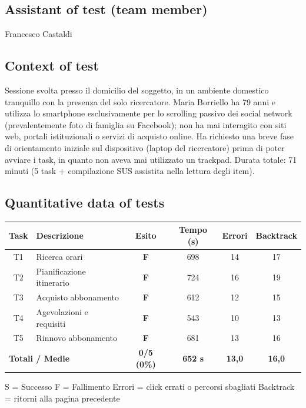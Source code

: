 \documentclass[11pt,a4paper]{article}
\begin{document}
\subsection*{Assistant of test (team member)}
\begin{tcolorbox}[colback=backgroundColor,colframe=borderColor,arc=2mm]
Francesco Castaldi
\end{tcolorbox}

\subsection*{Context of test}
\begin{tcolorbox}[colback=backgroundColor,colframe=borderColor,arc=2mm]
Sessione svolta presso il domicilio del soggetto, in un
ambiente domestico tranquillo con la presenza del solo
ricercatore. Maria Borriello ha 79 anni e utilizza lo
smartphone esclusivamente per lo scrolling passivo dei
social network (prevalentemente foto di famiglia su
Facebook); non ha mai interagito con siti web, portali
istituzionali o servizi di acquisto online. Ha richiesto
una breve fase di orientamento iniziale sul dispositivo
(laptop del ricercatore) prima di poter avviare i task,
in quanto non aveva mai utilizzato un trackpad. Durata
totale: 71 minuti (5 task + compilazione SUS assistita
nella lettura degli item).
\end{tcolorbox}

\subsection*{Quantitative data of tests}
\begin{tcolorbox}[colback=backgroundColor,colframe=borderColor,arc=2mm]
\begin{center}
\renewcommand{\arraystretch}{1.4}
\begin{tabular}{clcccc}
\toprule
\textbf{Task} & \textbf{Descrizione} &
\textbf{Esito} & \textbf{Tempo (s)} &
\textbf{Errori} & \textbf{Backtrack} \\
\midrule
T1 & Ricerca orari             & \textbf{F} & 698 & 14 & 17 \\
T2 & Pianificazione itinerario & \textbf{F} & 724 & 16 & 19 \\
T3 & Acquisto abbonamento      & \textbf{F} & 612 & 12 & 15 \\
T4 & Agevolazioni e requisiti  & \textbf{F} & 543 & 10 & 13 \\
T5 & Rinnovo abbonamento       & \textbf{F} & 681 & 13 & 16 \\
\midrule
\multicolumn{2}{l}{\textbf{Totali / Medie}} &
\textbf{0/5 (0\%)} & \textbf{652 s} &
\textbf{13,0} & \textbf{16,0} \\
\bottomrule
\end{tabular}
\end{center}
\vspace{0.3cm}
\small S = Successo \quad F = Fallimento \quad
Errori = click errati o percorsi sbagliati \quad
Backtrack = ritorni alla pagina precedente
\end{tcolorbox}
\end{document}
